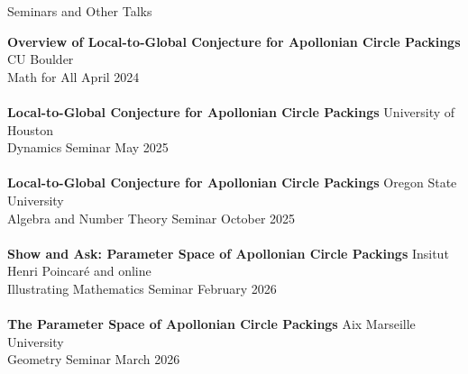 \documentclass{resume} %
\begin{document}

\begin{rSection}{Seminars and Other Talks}

 	  \textbf{Overview of Local-to-Global Conjecture for Apollonian Circle Packings} \hfill CU Boulder\\
 	 Math for All \hfill April 2024 \\ \\ 
     \textbf{Local-to-Global Conjecture for Apollonian Circle Packings} \hfill University of Houston\\
 	 Dynamics Seminar \hfill May 2025 \\ \\
     \textbf{Local-to-Global Conjecture for Apollonian Circle Packings} \hfill Oregon State University\\
 	 Algebra and Number Theory Seminar \hfill October 2025 \\ \\
     \textbf{Show and Ask: Parameter Space of Apollonian Circle Packings} \hfill Insitut Henri Poincaré and online \\
 	 Illustrating Mathematics Seminar \hfill February 2026 \\ \\
     \textbf{The Parameter Space of Apollonian Circle Packings} \hfill Aix Marseille University\\
 	 Geometry Seminar \hfill March 2026 \\ \\
\end{rSection}


\end{document}
